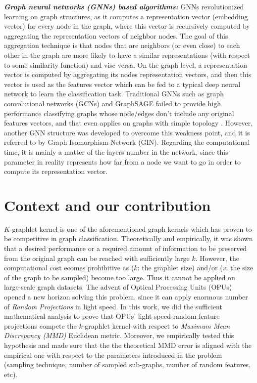 \textbf{\emph{Graph neural networks (GNNs) based algorithms:}} GNNs revolutionized learning on graph structures, as it computes a representation vector (embedding vector) for every node in the graph, where this vector is recursively computed by aggregating the representation vectors of neighbor nodes. The goal of this aggregation technique is that nodes that are neighbors (or even close) to each other in the graph are more likely to have a similar representations (with respect to some similarity function) and vise versa. On the graph level, a representation vector is computed by aggregating its nodes representation vectors, and then this vector is used as the features vector which can be fed to a typical deep neural network to learn the classification task. Traditional GNNs such as graph convolutional networks (GCNs) and GraphSAGE failed to provide high performance classifying graphs whose node/edges don't include any original features vectors,  and that even applies on graphs with simple topology \citep{GCN_powerful}. 
However, another GNN structure was developed to overcome this weakness point, and it is referred to by Graph Isomorphism Network (GIN). Regarding the computational time, it is mainly a matter of the layers number in the network, since this parameter in reality represents how far from a node we want to go in order to compute its representation vector. 

\section{Context and our contribution}
$K$-graphlet kernel is one of the aforementioned graph kernels which has proven to be  competitive in graph classification. Theoretically and empirically, it was shown that a desired performance or a required amount of information to be preserved from the original graph can be reached with sufficiently large $k$. However,  the computational cost  ecomes prohibitive as ($k$: the graphlet size) and/or ($v$: the size of the graph to be sampled)  become too large. Thus it cannot be applied on large-scale graph datasets. The advent of Optical Processing Units (OPUs) opened a new horizon solving this problem, since it can apply enormous number of \emph{Random Projections} in light speed. \newline
In this work, we did the sufficient mathematical analysis to prove that OPUs' light-speed random feature projections compete the $k$-graphlet kernel with respect to \emph{Maximum Mean Discrepancy (MMD)} Euclidean metric. Moreover, we empirically tested this hypothesis and made sure that the the theoretical MMD error is aligned with the empirical one with respect to the parameters introduced in the problem (sampling technique, number of sampled sub-graphs, number of random features, etc). 





